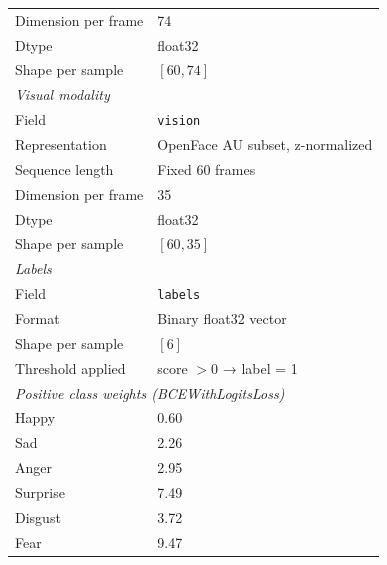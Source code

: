 \begin{table}[H]
\begin{tabular}{ll}
Dimension per frame           & 74 \\
Dtype                         & float32 \\
Shape per sample              & $[60, 74]$ \\
\hline
\multicolumn{2}{l}{\textit{Visual modality}} \\
\hline
Field                         & \texttt{vision} \\
Representation                & OpenFace AU subset, z-normalized \\
Sequence length               & Fixed 60 frames \\
Dimension per frame           & 35 \\
Dtype                         & float32 \\
Shape per sample              & $[60, 35]$ \\
\hline
\multicolumn{2}{l}{\textit{Labels}} \\
\hline
Field                         & \texttt{labels} \\
Format                        & Binary float32 vector \\
Shape per sample              & $[6]$ \\
Threshold applied             & score $> 0$ → label = 1 \\
\hline
\multicolumn{2}{l}{\textit{Positive class weights (BCEWithLogitsLoss)}} \\
\hline
Happy    & 0.60 \\
Sad      & 2.26 \\
Anger    & 2.95 \\
Surprise & 7.49 \\
Disgust  & 3.72 \\
Fear     & 9.47 \\
\hline
\end{tabular}
\end{table}